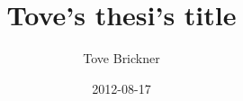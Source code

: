 \documentclass[a4paper,11pt]{report}
\begin{document}
\title{Tove's thesi's title}
\author{Tove Brickner}
\date{2012-08-17}
\maketitle



\tableofcontents*
\listoffigures
\listoftables






\end{document}

